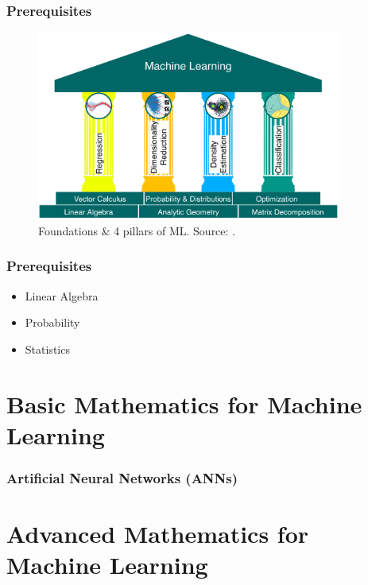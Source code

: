 \documentclass{beamer}
\begin{document}
\begin{frame}
	\frametitle{Prerequisites}
	\begin{figure}[H]
		\centering
		\includegraphics[width=10cm]{4_ML_pillars}
		\caption{Foundations \& 4 pillars of ML. Source: \cite[Fig. 1.1, p. 14]{Deisenroth_Faisal_Ong2023}.}
	\end{figure}
	
\end{frame}

\begin{frame}
	\frametitle{Prerequisites}
	\begin{itemize}
		\item Linear Algebra
		\item Probability
		\item Statistics
	\end{itemize}
\end{frame}

\section{Basic Mathematics for Machine Learning}

\begin{frame}
	\frametitle{Artificial Neural Networks (ANNs)}
\end{frame}

\section{Advanced Mathematics for Machine Learning}
	
\end{document}

